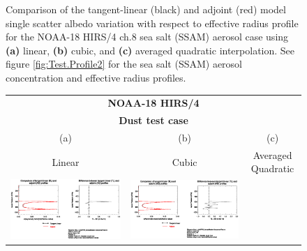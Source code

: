 \begin{figure}[htp]
\begin{tabular}{c c c}
  \end{tabular}
  \caption{Comparison of the tangent-linear (black) and adjoint (red) model single scatter albedo variation with respect to effective radius profile for the NOAA-18 HIRS/4 ch.8 sea salt (SSAM) aerosol case using \textbf{(a)} linear, \textbf{(b)} cubic, and \textbf{(c)} averaged quadratic interpolation. See figure \ref{fig:Test.Profile2} for the sea salt (SSAM) aerosol concentration and effective radius profiles.}
  \label{fig:hirs4_n18.ch8.SSAM.dw_dReff.AD}
\end{figure}

\begin{figure}[htp]
  \centering
  \begin{tabular}{c c c}
    \multicolumn{3}{c}{\qquad\sffamily\textbf{NOAA-18 HIRS/4}}\\
    \multicolumn{3}{c}{\qquad\sffamily\textbf{Dust test case}}\\
    \qquad\textsf{(a)} & \qquad\textsf{(b)}  & \qquad\textsf{(c)} \\
    \qquad\textsf{Linear} & \qquad\textsf{Cubic}  & \qquad\textsf{Averaged Quadratic} \\
    \includegraphics[bb=90 400 300 540,clip,scale=0.7]{graphics/Aerosol/AD/hirs4_n18.ch8.DUST.NLIN.dg_dReff.eps} &
    \includegraphics[bb=90 400 300 540,clip,scale=0.7]{graphics/Aerosol/AD/hirs4_n18.ch8.DUST.NCUBIC.dg_dReff.eps} &

\end{tabular}
\end{figure}
